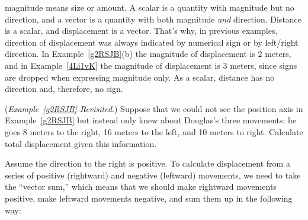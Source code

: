 \documentclass[main.tex]{subfiles}
\begin{document}
\vspace{1em}

\Gls{magnitude} means size or amount. A \gls{scalar} is a quantity with magnitude but no direction, and a \gls{vector} is a quantity with both magnitude \textit{and} direction. Distance is a scalar, and displacement is a vector. That's why, in previous examples, direction of displacement was always indicated by numerical sign or by left/right direction. In Example~\ref{g2RSJB}(b) the magnitude of displacement is 2 meters, and in Example~\ref{4Li1vK} the magnitude of displacement is 3 meters, since signs are dropped when expressing magnitude only. As a scalar, distance has no direction and, therefore, no sign.

\vspace{1em}

\begin{example} \label{LBLwIS}
    (\textit{Example~\ref{g2RSJB} Revisited}.) Suppose that we could not see the position axis in Example~\ref{g2RSJB} but instead only knew about Douglas's three movements: he goes 8 meters to the right, 16 meters to the left, and 10 meters to right. Calculate total displacement given this information.
\end{example}

\begin{center}
\end{center}

\Solution Assume the direction to the right is positive. To calculate displacement from a series of positive (rightward) and negative (leftward) movements, we need to take the ``vector sum,'' which means that we should make rightward movements positive, make leftward movements negative, and sum them up in the following way:
\end{document}
